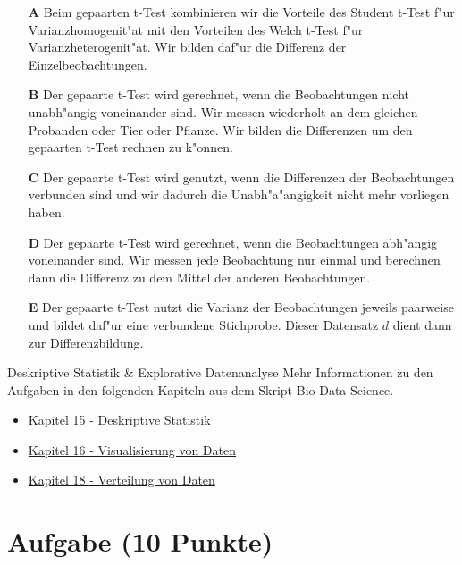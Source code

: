\documentclass[a4paper, 10pt]{scrartcl}\usepackage[]{graphicx}\usepackage[]{xcolor}
\begin{document}
\begin{enumerate}
\item [\textbf{A} \msquare] Beim gepaarten t-Test kombinieren wir die Vorteile des Student t-Test f{"u}r Varianzhomogenit{"a}t mit den Vorteilen des Welch t-Test f{"u}r Varianzheterogenit{"a}t. Wir bilden daf{"u}r die Differenz der Einzelbeobachtungen.
\item [\textbf{B} \msquare] Der gepaarte t-Test wird gerechnet, wenn die Beobachtungen nicht unabh{"a}ngig voneinander sind. Wir messen wiederholt an dem gleichen Probanden oder Tier oder Pflanze. Wir bilden die Differenzen um den gepaarten t-Test rechnen zu k{"o}nnen.
\item [\textbf{C} \msquare] Der gepaarte t-Test wird genutzt, wenn die Differenzen der Beobachtungen verbunden sind und wir dadurch die Unabh{"a}{"a}ngigkeit nicht mehr vorliegen haben.
\item [\textbf{D} \msquare] Der gepaarte t-Test wird gerechnet, wenn die Beobachtungen abh{"a}ngig voneinander sind. Wir messen jede Beobachtung nur einmal und berechnen dann die Differenz zu dem Mittel der anderen Beobachtungen.
\item [\textbf{E} \msquare] Der gepaarte t-Test nutzt die Varianz der Beobachtungen jeweils paarweise und bildet daf{"u}r eine verbundene Stichprobe. Dieser Datensatz $d$ dient dann zur Differenzbildung.
\end{enumerate}   
\clearpage
\begin{graybox}{Deskriptive Statistik \& Explorative Datenanalyse}
Mehr Informationen zu den Aufgaben in den folgenden Kapiteln aus dem Skript Bio Data Science.
  \begin{itemize}
  \item \href{https://jkruppa.github.io/eda-descriptive.html}{Kapitel 15 - Deskriptive Statistik}
  \item \href{https://jkruppa.github.io/eda-ggplot.html}{Kapitel 16 - Visualisierung von Daten}
  \item \href{https://jkruppa.github.io/eda-distribution.html}{Kapitel 18 - Verteilung von Daten}
  \end{itemize}
\end{graybox}
\clearpage

\section{Aufgabe \hfill (10 Punkte)}
\end{document}
